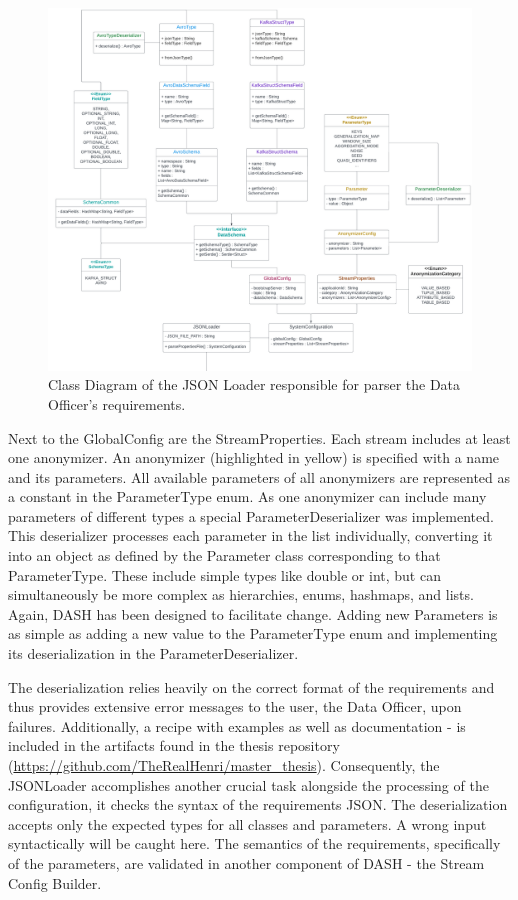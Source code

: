 \begin{figure}[H]
   \begin{adjustbox}{center}
   \includegraphics[width=0.85\pdfpagewidth]{img/Requirements_Parser_Class_Diagram.pdf}
   \end{adjustbox}
   \caption{Class Diagram of the JSON Loader responsible for parser the Data Officer's requirements.\label{fig:requirements_parser}}
\end{figure}

Next to the GlobalConfig are the StreamProperties. Each stream includes at least one anonymizer. An anonymizer (highlighted in yellow) is specified with a name and its parameters. All available parameters of all anonymizers are represented as a constant in the ParameterType enum. As one anonymizer can include many parameters of different types a special ParameterDeserializer was implemented. This deserializer processes each parameter in the list individually, converting it into an object as defined by the Parameter class corresponding to that ParameterType. These include simple types like double or int, but can simultaneously be more complex as hierarchies, enums, hashmaps, and lists. Again, \ac{DASH} has been designed to facilitate change. Adding new Parameters is as simple as adding a new value to the ParameterType enum and implementing its deserialization in the ParameterDeserializer.\par
The deserialization relies heavily on the correct format of the requirements and thus provides extensive error messages to the user, the Data Officer, upon failures. Additionally, a recipe with examples as well as documentation - is included in the artifacts found in the thesis repository (\url{https://github.com/TheRealHenri/master_thesis}). Consequently, the JSONLoader accomplishes another crucial task alongside the processing of the configuration, it checks the syntax of the requirements JSON. The deserialization accepts only the expected types for all classes and parameters. A wrong input syntactically will be caught here. The semantics of the requirements, specifically of the parameters, are validated in another component of \ac{DASH} - the Stream Config Builder. 

